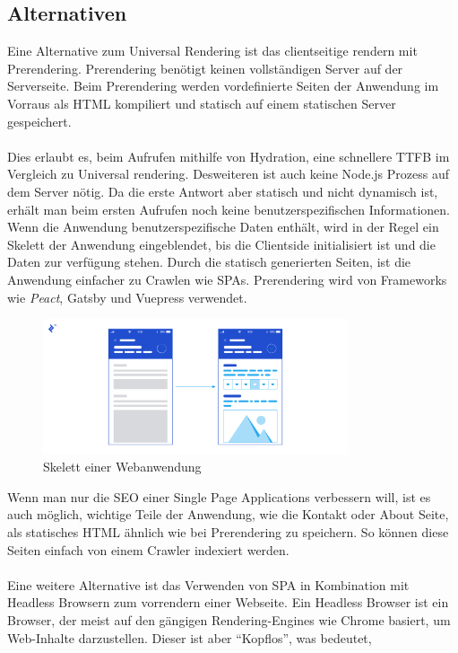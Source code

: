 \documentclass[runningheads]{llncs}
\numberwithin{figure}{section}
\begin{document}
\subsection{Alternativen}
\label{subsec:Alternativen}
Eine Alternative zum Universal Rendering ist das clientseitige rendern mit Prerendering. 
Prerendering benötigt keinen vollständigen Server auf der Serverseite. 
Beim Prerendering werden vordefinierte Seiten der Anwendung im Vorraus als HTML kompiliert und 
statisch auf einem statischen Server gespeichert. 
\\
\\
Dies erlaubt es, beim Aufrufen mithilfe von Hydration, 
eine schnellere TTFB im Vergleich zu Universal rendering. 
Desweiteren ist auch keine Node.js Prozess auf dem Server nötig. 
Da die erste Antwort aber statisch und nicht dynamisch ist, 
erhält man beim ersten Aufrufen noch keine benutzerspezifischen Informationen. 
Wenn die Anwendung benutzerspezifische Daten enthält, 
wird in der Regel ein Skelett der Anwendung eingeblendet, 
bis die Clientside initialisiert ist und die Daten zur verfügung stehen. 
Durch die statisch generierten Seiten, 
ist die Anwendung einfacher zu Crawlen wie SPAs. 
Prerendering wird von Frameworks wie \textit{Peact}, 
Gatsby und Vuepress verwendet.
\begin{figure}[h]
  \centering
  \includegraphics[width=9cm]{images/WebsiteSceleton}
  \caption{Skelett einer Webanwendung \cite{breux_2018}}
\end{figure}
\newpage
\noindent
Wenn man nur die SEO einer Single Page Applications verbessern will, 
ist es auch möglich, 
wichtige Teile der Anwendung, 
wie die Kontakt oder About Seite, 
als statisches HTML ähnlich wie bei Prerendering zu speichern. 
So können diese Seiten einfach von einem Crawler indexiert werden.
\\
\\
Eine weitere Alternative ist das Verwenden von SPA in Kombination mit Headless Browsern zum vorrendern einer Webseite. 
Ein Headless Browser ist ein Browser, 
der meist auf den gängigen Rendering-Engines wie Chrome basiert, 
um Web-Inhalte darzustellen. Dieser ist aber “Kopflos”, was bedeutet, 
\end{document}
